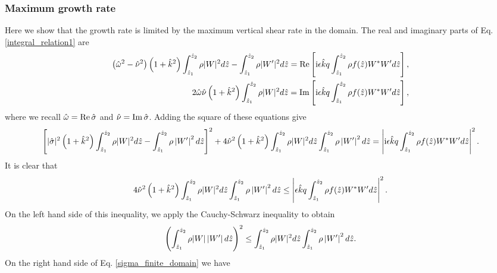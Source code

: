 \subsubsection{Maximum growth rate}\label{max_growth1}
Here we show that the growth rate is limited by the maximum vertical
shear rate in the domain. %
The real and imaginary parts of 
Eq. \ref{integral_relation1} are
\begin{align}
  \left(\hat{\omega}^2-\hat{\nu}^2\right)\left(1+\hat{k}^2\right)
  \int_{\hat{z}_1}^{\hat{z}_2}\rho|W|^2d\hat{z} -
  \int_{\hat{z}_1}^{\hat{z}_2}\rho|W^\prime|^2d\hat{z}
  \notag
  =\operatorname{Re}\left[\mathrm{i}
    \epsilon\hat{k}q \int_{\hat{z}_1}^{\hat{z}_2}\rho
    f(\hat{z}) W^*W^\prime d\hat{z}\right], \\
   2\hat{\omega}\hat{\nu}\left(1+\hat{k}^2\right)
  \int_{\hat{z}_1}^{\hat{z}_2}\rho|W|^2d\hat{z}
  =\operatorname{Im}\left[\mathrm{i}
    \epsilon\hat{k}q \int_{\hat{z}_1}^{\hat{z}_2}\rho
    f(\hat{z}) W^*W^\prime d\hat{z}\right],
\end{align}
where we recall $\hat{\omega} = \operatorname{Re} \hat{\sigma}$ and
$\hat{\nu}=\operatorname{Im}\hat{\sigma}$. 
Adding the square of these equations give
\begin{align}
  \left[|\hat{\sigma}|^2\left(1+\hat{k}^2\right)
    \int_{\hat{z}_1}^{\hat{z}_2}\rho|W|^2d\hat{z} -
    \int_{\hat{z}_1}^{\hat{z}_2}\rho\left|W^\prime \right|^2d\hat{z}\right]^2
  +4\hat{\nu}^2\left(1+\hat{k}^2\right) 
  \int_{\hat{z}_1}^{\hat{z}_2}\rho
  |W|^2d\hat{z}\int_{\hat{z}_1}^{\hat{z}_2}\rho\left|W^\prime \right|^2d\hat{z}
  =\left|\mathrm{i}
    \epsilon\hat{k}q\int_{\hat{z}_1}^{\hat{z}_2}\rho
    f(\hat{z}) W^*W^\prime d\hat{z}\right|^2.
\end{align}
It is clear that
\begin{align}\label{sigma_finite_domain} 
  4\hat{\nu}^2\left(1+\hat{k}^2\right) 
  \int_{\hat{z}_1}^{\hat{z}_2}\rho
  |W|^2d\hat{z}\int_{\hat{z}_1}^{\hat{z}_2}\rho\left|W^\prime
  \right|^2d\hat{z} 
  \leq\left|
    \epsilon\hat{k}q\int_{\hat{z}_1}^{\hat{z}_2}\rho
    f(\hat{z}) W^*W^\prime d\hat{z}\right|^2.
\end{align}
On the left hand side of this inequality, we apply the Cauchy-Schwarz
inequality to obtain
\begin{align}
  \left( \int_{\hat{z}_1}^{\hat{z}_2}\rho
    |W|\left|W^\prime \right|d\hat{z}\right)^2\leq
  \int_{\hat{z}_1}^{\hat{z}_2}\rho 
  |W|^2d\hat{z}\int_{\hat{z}_1}^{\hat{z}_2}\rho\left|W^\prime \right|^2d\hat{z}.
\end{align}
On the right hand side of Eq. \ref{sigma_finite_domain} we have
